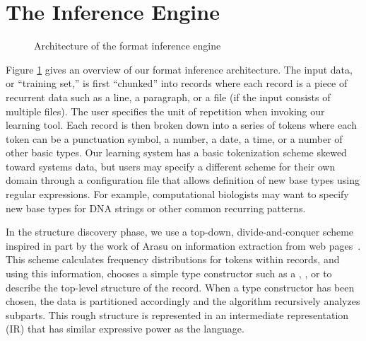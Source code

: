 \documentclass{article}
\begin{document}

\section*{The Inference Engine}
\begin{figure}
\begin{center}
\caption{Architecture of the format inference engine}
\label{fig-archi}
\end{center}
\end{figure}
Figure \ref{fig-archi} gives an overview of our format inference
architecture. The input data, or ``training set,'' 
is first ``chunked'' into records where
each record is a piece of recurrent data such as a line, 
a paragraph, or a file (if the input consists of multiple files).
The user specifies the unit of repetition when invoking our 
learning tool.
Each record is then broken down into a series of tokens where each
token can be a punctuation symbol, a number, a date, a time, or a number of other
basic types.  Our learning system has a basic tokenization scheme
skewed toward systems data, but users may specify a different scheme 
for their own domain through a configuration file that allows definition 
of new base types using regular expressions.  For example,
computational biologists may want to specify new base types for DNA strings
or other common recurring patterns.

In the structure discovery phase, we use a top-down, divide-and-conquer
scheme inspired in part by the work of Arasu on
information extraction from web pages~\cite{arasu+:sigmod03}. 
This scheme calculates
frequency distributions for tokens within records, and using this information,
chooses a simple type constructor such as a , , or
 to describe the top-level structure of the record. 
When a type constructor has been chosen, the data is partitioned accordingly
and the algorithm recursively analyzes subparts.  This
rough structure is represented in an intermediate representation (IR)
that has similar expressive power as the \pads{} language. 
\end{document}
